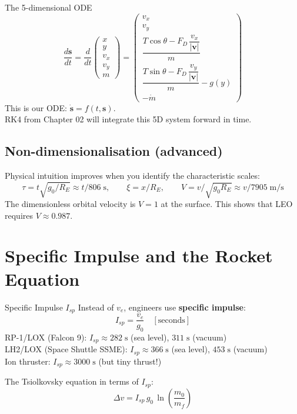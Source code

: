 \documentclass[12pt, a4paper]{article}
\begin{document}
\begin{theorybox}{The 5-dimensional ODE}
\[
\frac{d\mathbf{s}}{dt} = \frac{d}{dt}
\begin{pmatrix} x \\ y \\ v_x \\ v_y \\ m \end{pmatrix}
=
\begin{pmatrix}
  v_x \\[0.3em]
  v_y \\[0.3em]
  \dfrac{T\cos\theta - F_D\,\dfrac{v_x}{|\mathbf{v}|}}{m} \\[0.8em]
  \dfrac{T\sin\theta - F_D\,\dfrac{v_y}{|\mathbf{v}|}}{m} - g(y) \\[0.8em]
  -\dot{m}
\end{pmatrix}
\]
This is our ODE: $\dot{\mathbf{s}} = f(t, \mathbf{s})$.\\
RK4 from Chapter 02 will integrate this 5D system forward in time.
\end{theorybox}

\subsection*{Non-dimensionalisation (advanced)}

Physical intuition improves when you identify the characteristic scales:
\[
  \tau = t\sqrt{g_0/R_E} \approx t/806\;\text{s}, \qquad
  \xi = x/R_E, \qquad
  V = v/\sqrt{g_0 R_E} \approx v/7905\;\text{m/s}
\]
The dimensionless orbital velocity is $V=1$ at the surface. This shows that LEO requires $V \approx 0.987$.

\section{Specific Impulse and the Rocket Equation}

\begin{theorybox}{Specific Impulse $I_{sp}$}
Instead of $v_e$, engineers use \textbf{specific impulse}:
\[
  I_{sp} = \frac{v_e}{g_0} \quad [\text{seconds}]
\]
RP-1/LOX (Falcon 9): $I_{sp} \approx 282\;\text{s}$ (sea level), $311\;\text{s}$ (vacuum)\\
LH2/LOX (Space Shuttle SSME): $I_{sp} \approx 366\;\text{s}$ (sea level), $453\;\text{s}$ (vacuum)\\
Ion thruster: $I_{sp} \approx 3000\;\text{s}$ (but tiny thrust!)

The Tsiolkovsky equation in terms of $I_{sp}$:
\[
  \Delta v = I_{sp}\,g_0\,\ln\!\left(\frac{m_0}{m_f}\right)
\]
\end{theorybox}
\end{document}
